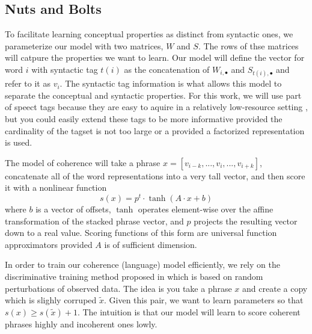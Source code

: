 \documentclass[11pt,letterpaper]{article}
\begin{document}
\subsection{Nuts and Bolts}
To facilitate learning conceptual properties as distinct from syntactic ones,
we parameterize our model with two matrices, $W$ and $S$.
The rows of thse matrices will catpure the properties we want to learn.
Our model will define the vector for word $i$ with syntactic tag $t(i)$
as the concatenation of $W_{i,\bullet}$ and $S_{t(i),\bullet}$ and refer to it as $v_i$.
The syntactic tag information is what allows this model to separate the conceptual
and syntactic properties. For this work, we will use part of speect tags because
they are easy to aquire in a relatively low-resource setting \cite{pos},
but you could easily extend these tags to be more informative provided
the cardinality of the tagset is not too large or a provided a factorized representation is used.

The model of coherence will take a phrase $x = [v_{i-k}, ..., v_i, ..., v_{i+k}]$,
concatenate all of the word representations into a very tall vector, and then score it
with a nonlinear function
\[
	s(x) = p^t \cdot \tanh( A \cdot x + b )
\]
where $b$ is a vector of offsets,
$\tanh$ operates element-wise over the affine transformation of the stacked phrase vector,
and $p$ projects the resulting vector down to a real value.
Scoring functions of this form are universal function approximators
provided $A$ is of sufficient dimension\cite{Hornik:1989}.

In order to train our coherence (language) model efficiently, we rely on
the discriminative training method proposed in \cite{rami} which is based
on random perturbations of observed data. The idea is you take a phrase $x$
and create a copy which is slighly corruped $\tilde{x}$. Given this pair,
we want to learn parameters so that $s(x) \ge s(\tilde{x}) + 1$.
The intuition is that our model will learn to score coherent phrases highly
and incoherent ones lowly.
\end{document}
